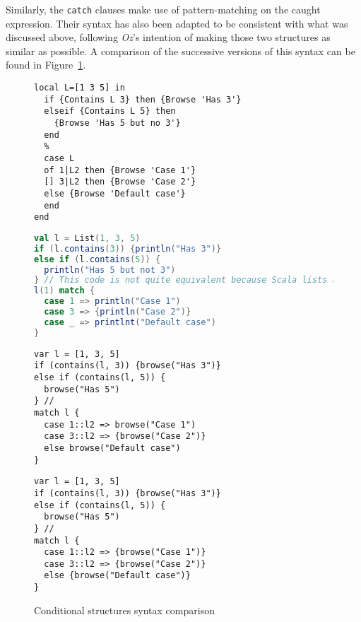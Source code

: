 Similarly, the \texttt{catch} clauses make use of pattern-matching on the caught expression.
Their syntax has also been adapted to be consistent with what was discussed above, following \textit{Oz}'s intention of making those two structures as similar as possible.\newline
A comparison of the successive versions of this syntax can be found in Figure~\ref{fig:code-comp-cond}.
\begin{figure}
    \noindent\begin{minipage}{.49\textwidth}
\begin{lstlisting}[title={Oz},language=oz]
local L=[1 3 5] in
  if {Contains L 3} then {Browse 'Has 3'}
  elseif {Contains L 5} then
    {Browse 'Has 5 but no 3'}
  end
  %
  case L
  of 1|L2 then {Browse 'Case 1'}
  [] 3|L2 then {Browse 'Case 2'}
  else {Browse 'Default case'}
  end
end
\end{lstlisting}
    \end{minipage}
    \hfill
    \noindent\begin{minipage}{.49\textwidth}
\begin{lstlisting}[title={Scala/Ozma},language=scala]
val l = List(1, 3, 5)
if (l.contains(3)) {println("Has 3")}
else if (l.contains(5)) {
  println("Has 5 but not 3")
} // This code is not quite equivalent because Scala lists aren't recursive structures :
l(1) match {
  case 1 => println("Case 1")
  case 3 => {println("Case 2")}
  case _ => printlnt("Default case")
}
\end{lstlisting}
    \end{minipage}
    \noindent\begin{minipage}{.49\textwidth}
\begin{lstlisting}[title={NewOz 2020},language=newoz]
var l = [1, 3, 5]
if (contains(l, 3)) {browse("Has 3")}
else if (contains(l, 5)) {
  browse("Has 5")
} //
match l {
  case 1::l2 => browse("Case 1")
  case 3::l2 => {browse("Case 2")}
  else browse("Default case")
}
\end{lstlisting}
    \end{minipage}
    \hfill
    \noindent\begin{minipage}{.49\textwidth}
\begin{lstlisting}[title={NewOz 2021},language=newoz]
var l = [1, 3, 5]
if (contains(l, 3)) {browse("Has 3")}
else if (contains(l, 5)) {
  browse("Has 5")
} //
match l {
  case 1::l2 => {browse("Case 1")}
  case 3::l2 => {browse("Case 2")}
  else {browse("Default case")}
}
\end{lstlisting}
    \end{minipage}
\caption{Conditional structures syntax comparison}
\label{fig:code-comp-cond}
\end{figure}

